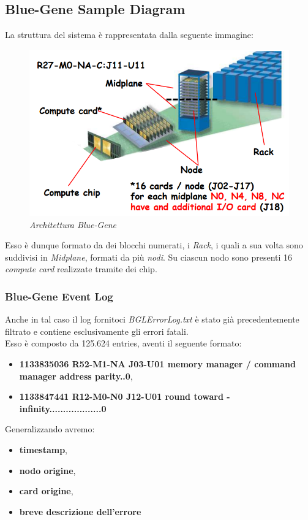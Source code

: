 \subsection{Blue-Gene Sample Diagram}
La struttura del sistema è rappresentata dalla seguente immagine:
\begin{figure}[H]
	\centering
	\includegraphics[width=\textwidth]{img/hw6/BG.png}
	\caption{\textit{Architettura Blue-Gene}}
\end{figure}
Esso è dunque formato da dei blocchi numerati, i \textit{Rack}, i quali a sua volta sono suddivisi in \textit{Midplane}, formati da più \textit{nodi}. Su ciascun nodo sono presenti 16 \textit{compute card} realizzate tramite dei chip.
\subsubsection{Blue-Gene Event Log}
Anche in tal caso il log fornitoci \textit{BGLErrorLog.txt} è stato già precedentemente filtrato e contiene esclusivamente gli errori fatali.
\\
Esso è composto da 125.624 entries, aventi il seguente formato:
\begin{itemize}
	\item \textbf{1133835036 R52-M1-NA J03-U01  memory manager / command manager address parity..0},
	\item \textbf{1133847441 R12-M0-N0 J12-U01  round toward -infinity...................0}
\end{itemize}
Generalizzando avremo:
\begin{itemize}
	\item \textbf{timestamp},
	\item \textbf{nodo origine},
	\item \textbf{card origine},
	\item \textbf{breve descrizione dell'errore}
\end{itemize}



